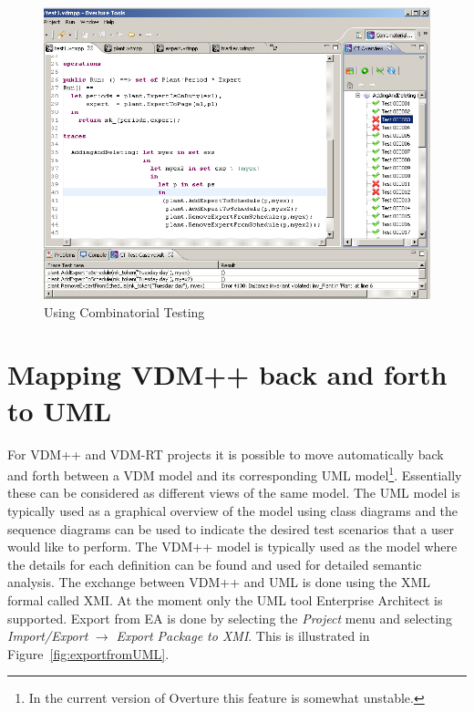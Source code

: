 \documentclass{overturerepchap}
\begin{document}
\begin{figure}[htbp]
\begin{center}
\includegraphics[width=4.5in]{screenDumps/tracesalarm}
\caption{Using Combinatorial Testing\label{fig:tracesalarm}}
\end{center}
\end{figure}

\chapter{Mapping VDM++ back and forth to UML}\label{sec:vdmuml}

For VDM++ and VDM-RT projects it is
possible to move automatically back and forth between a VDM model
and its corresponding UML model\footnote{In the current version of
  Overture this feature is somewhat unstable.}. 
Essentially these can be considered
as different views of the same model. The UML model is typically used
as a graphical overview of the model using class diagrams and the
sequence diagrams can be used to indicate the desired test scenarios
that a user would like to perform. The VDM++ model is typically used
as the model where the details for each definition can be found and
used for detailed semantic analysis. The exchange between VDM++ and
UML is done using the XML formal called XMI. At the moment
only the UML tool Enterprise Architect is
supported. Export from EA is done by selecting the \emph{Project} menu
and selecting \emph{Import/Export} $\rightarrow$ \emph{Export Package
  to XMI}. This is illustrated in Figure~\ref{fig:exportfromUML}.
\end{document}
